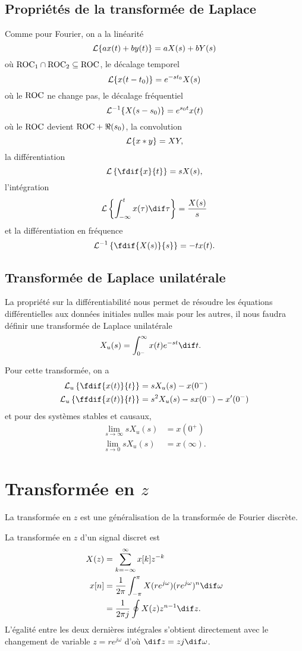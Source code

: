 \subsection{Propriétés de la transformée de Laplace}
Comme pour Fourier, on a la linéarité
\[ \mathcal{L}\{ax(t)+by(t)\} = aX(s) + bY(s) \]
où $\mathrm{ROC}_1 \cap \mathrm{ROC}_2 \subseteq \mathrm{ROC}$,
le décalage temporel
\[ \mathcal{L}\{x(t-t_0)\} = e^{-st_0}X(s) \]
où le $\mathrm{ROC}$ ne change pas,
le décalage fréquentiel
\[ \mathcal{L}^{-1}\{X(s-s_0)\} = e^{s_0t}x(t) \]
où le $\mathrm{ROC}$ devient $\mathrm{ROC} + \Re(s_0)$,
la convolution
\[ \mathcal{L}\{x*y\} = XY, \]
la différentiation
\[ \laplace\left\{\fdif{x}{t}\right\} = sX(s), \]
l'intégration
\[ \laplace\left\{\int_{-\infty}^tx(\tau)\dif\tau\right\} = \frac{X(s)}{s} \]
et la différentiation en fréquence
\[ \laplace^{-1}\left\{\fdif{X(s)}{s}\right\} = -tx(t). \]

\subsection{Transformée de Laplace unilatérale}
\label{sec:laplacu}
La propriété sur la différentiabilité nous permet de résoudre les équations
différentielles aux données initiales nulles mais pour les autres,
il nous faudra définir une transformée de Laplace unilatérale
\begin{align*}
  X_u(s) & = \int_{0^-}^\infty x(t) e^{-st} \dif t.
\end{align*}

Pour cette transformée, on a
\begin{align*}
  \laplacu\left\{\fdif{x(t)}{t}\right\} & =
  sX_u(s) - x(0^-)\\
  \laplacu\left\{\ffdif{x(t)}{t}\right\} & =
  s^2X_u(s) - sx(0^-) - x'(0^-)
\end{align*}
et pour des systèmes stables et causaux,
\begin{align*}
  \lim_{s\to\infty} sX_u(s) & = x(0^+)\\
  \lim_{s\to 0} sX_u(s) & = x(\infty).
\end{align*}

\section{Transformée en $z$}
La transformée en $z$ est une généralisation de la transformée de Fourier
discrète.

La transformée en $z$ d'un signal discret est
\begin{align*}
  X(z) & = \sum_{k=-\infty}^{\infty} x[k]z^{-k}\\
  x[n] & =
  \frac{1}{2\pi}\int_{-\pi}^{\pi} X(re^{j\omega})(re^{j\omega})^n\dif \omega\\
  & = \frac{1}{2\pi j}\oint X(z) z^{n-1} \dif z.
\end{align*}
L'égalité entre les deux dernières intégrales
s'obtient directement avec le changement
de variable $z = re^{j\omega}$ d'où $\dif z = zj\dif \omega$.

